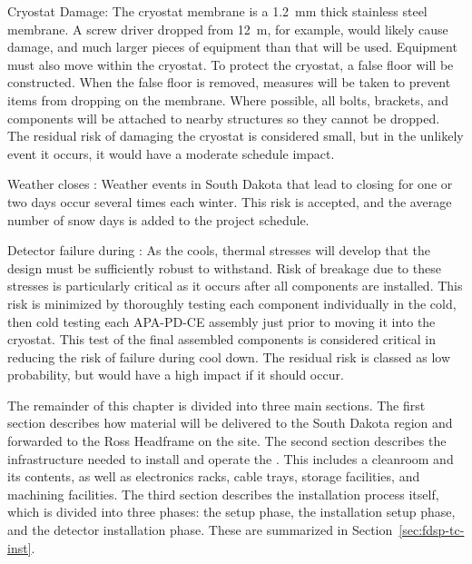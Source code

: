 Cryostat Damage:
The cryostat membrane is a \SI{1.2}{mm} thick stainless steel membrane. A screw driver dropped from \SI{12}{m}, for example, would likely cause damage, and much larger pieces of equipment than that will be used. Equipment must also move within the cryostat. To protect the cryostat, a false floor will be constructed. %
When the false floor is removed, measures will be taken to prevent items from dropping on the membrane. Where possible, all bolts, brackets, and components will be attached to nearby structures so they cannot be dropped. The residual risk of damaging the cryostat is considered small, but in the unlikely event it occurs, it would have a moderate schedule impact.

Weather closes : 
Weather events in South Dakota that lead to closing  for one or two days occur several times each winter. This risk is accepted, and the average number of snow days is added to the project schedule.

Detector failure during \cooldown: 
As the  cools, thermal stresses will develop that the design must be %
sufficiently robust to withstand. %
Risk of breakage due to these stresses is particularly critical as it occurs %
after all components are installed. This risk is minimized by thoroughly testing each component individually in the cold, then cold testing %
each APA-PD-CE assembly %
just prior to moving it into the cryostat. This test of the final assembled components is considered critical in reducing the risk of failure during cool down. The residual risk is classed as low probability, but would have a high impact if it should occur.

The remainder of this chapter is divided into three main sections. 
The first section describes how material will be delivered to the South Dakota region and forwarded to the Ross Headframe on the  site. 
The second section describes the infrastructure needed to install and operate the . This includes a cleanroom and its contents, as well as electronics racks, cable trays, storage facilities, and machining facilities. 
The third section describes the installation process itself, which is divided into three phases: the  setup phase, the installation setup phase, and the detector installation phase. These are summarized in Section~\ref{sec:fdsp-tc-inst}. %
